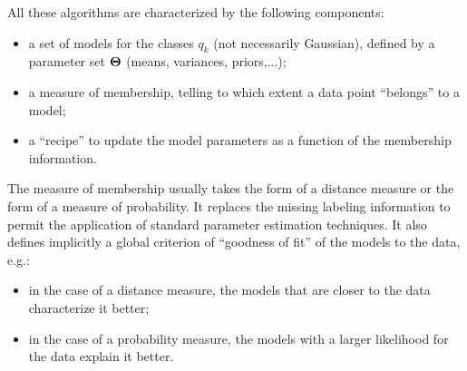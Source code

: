 \documentclass[a4paper]{article}
\newcommand{\Tm}{\ensuremath\boldsymbol{\Theta}}  %
\begin{document}
%
All these algorithms are characterized by the following components:
\begin{itemize}
\item a set of models for the classes $q_k$ (not necessarily
  Gaussian), defined by a parameter set $\Tm$ (means, variances,
  priors,...);
\item a measure of membership, telling to which extent a data point
``belongs'' to a model;
\item a ``recipe'' to update the model parameters as a function of the
  membership information.
\end{itemize}
The measure of membership usually takes the form of a distance measure
or the form of a measure of probability. It replaces the missing
labeling information to permit the application of standard parameter
estimation techniques.  It also defines implicitly a global criterion
of ``goodness of fit'' of the models to the data, e.g.:
\begin{itemize}
\item in the case of a distance measure, the models that are closer to
  the data characterize it better;
\item in the case of a probability measure, the models with a larger
  likelihood for the data explain it better.
\end{itemize}
\end{document}
